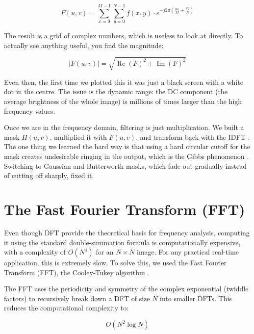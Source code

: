 \begin{equation}
    F(u, v) = \sum_{x=0}^{M-1} \sum_{y=0}^{N-1} f(x, y) \cdot
    e^{-j 2\pi \left(\frac{ux}{M} + \frac{vy}{N}\right)}
\end{equation}

\noindent
The result is a grid of complex numbers, which is useless to look at directly.
To actually see anything useful, you find the magnitude:

\begin{equation}
    |F(u,v)| = \sqrt{\operatorname{Re}(F)^2 + \operatorname{Im}(F)^2}
\end{equation}

Even then, the first time we plotted this it was just a black screen with a
white dot in the centre. The issue is the dynamic range: the DC component (the
average brightness of the whole image) is millions of times larger than the high
frequency values.


\vspace{0.15in}
\noindent
Once we are in the frequency domain, filtering is just multiplication.
We built a mask $H(u,v)$, multiplied it with $F(u,v)$, and transform back with the IDFT
\cite{brigham1988}. The one thing we learned the hard way is that using a hard circular
cutoff for the mask creates undesirable ringing in the output, which is the Gibbs phenomenon
\cite{pratt2007}. Switching to Gaussian and Butterworth masks, which fade out gradually
instead of cutting off sharply, fixed it.


\section{The Fast Fourier Transform (FFT)}

Even though DFT provide the theoretical basis for frequency analysis, computing it using the standard double-summation formula is computationally expensive, with a complexity of $O(N^4)$ for an $N \times N$ image. For any practical real-time application, this is extremely slow. To solve this, we used the Fast Fourier Transform (FFT), the Cooley-Tukey algorithm \cite{cooley1965}.

\vspace{0.15in}
\noindent
The FFT uses the periodicity and symmetry of the complex exponential (twiddle factors) to recursively break down a DFT of size $N$ into smaller DFTs. This reduces the computational complexity to:

\begin{equation}
    O(N^2 \log N)
\end{equation}


